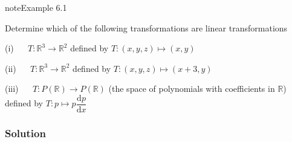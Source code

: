 \documentclass[letterpaper,10pt,english]{jupyterBook}
\begin{document}
\begin{sphinxadmonition}{note}{Example 6.1}



\sphinxAtStartPar
Determine which of the following transformations are linear transformations

\sphinxAtStartPar
(i)   \(T: \mathbb{R}^3 \to \mathbb{R}^2\) defined by \(T: (x, y, z) \mapsto (x, y)\)

\sphinxAtStartPar
(ii)   \(T: \mathbb{R}^3 \to \mathbb{R}^2\) defined by \(T: (x, y, z) \mapsto (x + 3, y)\)

\sphinxAtStartPar
(iii)   \(T: P(\mathbb{R}) \to P(\mathbb{R})\) (the space of polynomials with coefficients in \(\mathbb{R}\)) defined by \(T: p \mapsto p \dfrac{\mathrm{d}p}{\mathrm{d}x}\)
\subsubsection*{Solution}


\end{sphinxadmonition}
\end{document}
